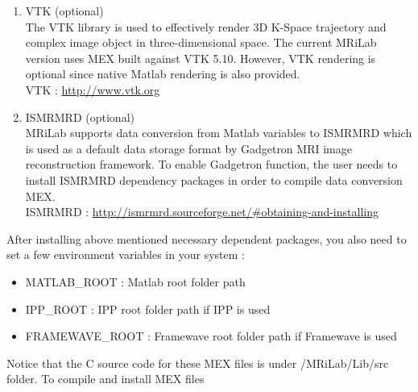 \documentclass{book}%
\begin{document}
\begin{enumerate}
\item VTK (optional) \\
The VTK library is used to effectively render 3D K-Space trajectory and complex image object in three-dimensional space. The current MRiLab version uses MEX built against VTK 5.10. However, VTK rendering is optional since native Matlab rendering is also provided. \\

VTK : \url{http://www.vtk.org} \\

\item ISMRMRD (optional) \\
MRiLab supports data conversion from Matlab variables to ISMRMRD which is used as a default data storage format by Gadgetron MRI image reconstruction framework. To enable Gadgetron function, the user needs to install ISMRMRD dependency packages in order to compile data conversion MEX. \\

ISMRMRD : \url{http://ismrmrd.sourceforge.net/#obtaining-and-installing}

\end{enumerate}

After installing above mentioned necessary dependent packages, you also need to set a few environment variables in your system : 

\begin{itemize}
\item MATLAB\_ROOT : Matlab root folder path
\item IPP\_ROOT : IPP root folder path if IPP is used
\item FRAMEWAVE\_ROOT : Framewave root folder path if Framewave is used
\end{itemize}

Notice that the C source code for these MEX files is under /MRiLab/Lib/src folder. To compile and install MEX files
\end{document}
